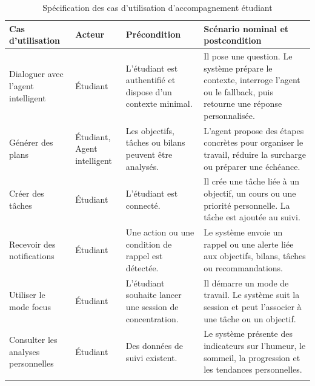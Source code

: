 \documentclass{rapportENSET}
\begin{document}
\begin{longtable}{@{}L{0.20\textwidth}L{0.18\textwidth}L{0.25\textwidth}L{0.27\textwidth}@{}}
\toprule
\textbf{Cas d'utilisation} & \textbf{Acteur} & \textbf{Précondition} & \textbf{Scénario nominal et postcondition} \\
\midrule
\endhead
Dialoguer avec l'agent intelligent & Étudiant & L'étudiant est authentifié et dispose d'un contexte minimal. & Il pose une question. Le système prépare le contexte, interroge l'agent ou le fallback, puis retourne une réponse personnalisée. \\
Générer des plans & Étudiant, Agent intelligent & Les objectifs, tâches ou bilans peuvent être analysés. & L'agent propose des étapes concrètes pour organiser le travail, réduire la surcharge ou préparer une échéance. \\
Créer des tâches & Étudiant & L'étudiant est connecté. & Il crée une tâche liée à un objectif, un cours ou une priorité personnelle. La tâche est ajoutée au suivi. \\
Recevoir des notifications & Étudiant & Une action ou une condition de rappel est détectée. & Le système envoie un rappel ou une alerte liée aux objectifs, bilans, tâches ou recommandations. \\
Utiliser le mode focus & Étudiant & L'étudiant souhaite lancer une session de concentration. & Il démarre un mode de travail. Le système suit la session et peut l'associer à une tâche ou un objectif. \\
Consulter les analyses personnelles & Étudiant & Des données de suivi existent. & Le système présente des indicateurs sur l'humeur, le sommeil, la progression et les tendances personnelles. \\
\bottomrule
\caption{Spécification des cas d'utilisation d'accompagnement étudiant}
\end{longtable}
\end{document}

